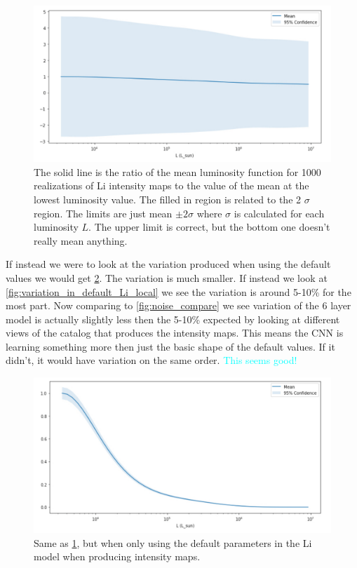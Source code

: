 \documentclass{article}
\newcommand{\dnp}[1]{\textcolor{cyan}{#1}}
\begin{document}
		\begin{figure}[H]
			\centering
			\includegraphics[width=1.0\textwidth]{variation_in_Li.pdf}
			\caption{The solid line is the ratio of the mean luminosity function for 1000 realizations of Li intensity maps to the value of the mean at the lowest luminosity value.  The filled in region is related to the 2 \(\sigma\) region.  The limits are just mean \(\pm 2 \sigma\) where \(\sigma\) is calculated for each luminosity \(L\).  The upper limit is correct, but the bottom one doesn't really mean anything.}
			\label{fig:variation_in_Li}
		\end{figure}

		If instead we were to look at the variation produced when using the default values we would get \cref{fig:variation_in_default_Li}.  The variation is much smaller.  If instead we look at \cref{fig:variation_in_default_Li_local} we see the variation is around 5-10\% for the most part.  Now comparing to \cref{fig:noise_compare} we see variation of the 6 layer model is actually slightly less then the 5-10\% expected by looking at different views of the catalog that produces the intensity maps.  This means the CNN is learning something more then just the basic shape of the default values.  If it didn't, it would have variation on the same order.  \dnp{This seems good!}

		\begin{figure}[H]
			\centering
			\includegraphics[width=1.0\textwidth]{variation_in_default_Li.pdf}
			\caption{Same as \cref{fig:variation_in_Li}, but when only using the default parameters in the Li model when producing intensity maps.}
			\label{fig:variation_in_default_Li}
		\end{figure}
\end{document}
